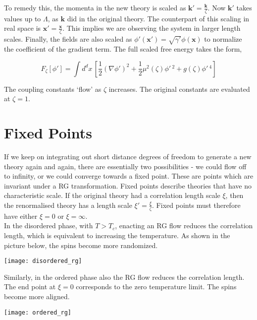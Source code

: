 \noindent To remedy this, the momenta in the new theory is scaled as $\boldsymbol{k}'=\frac{\boldsymbol{k}}{\zeta}$. Now $\boldsymbol{k}'$ takes values up to $\Lambda$, as $\boldsymbol{k}$ did in the original theory. The counterpart of this scaling in real space is $\boldsymbol{x}'=\frac{\boldsymbol{x}}{\zeta}$. This implies we are observing the system in larger length scales. Finally, the fields are also scaled as $\phi'(\boldsymbol{x}')=\sqrt{\gamma'}\phi(\boldsymbol{x})$ to normalize the coefficient of the gradient term. The full scaled free energy takes the form,

$$F_\zeta[\phi']=\int d^dx\, \left[\frac{1}{2}(\nabla\phi')^2+\frac{1}{2}\mu^2(\zeta)\phi'\,^2+g(\zeta)\phi'\,^4\right]$$

\noindent The coupling constants `flow' as $\zeta$ increases. The original constants are evaluated at $\zeta=1$.

\section{Fixed Points}
If we keep on integrating out short distance degrees of freedom to generate a new theory again and again, there are essentially two possibilities - we could flow off to infinity, or we could converge towards a fixed point. These are points which are invariant under a RG transformation. Fixed points describe theories that have no characteristic scale. If the original theory had a correlation length scale $\xi$, then the renormalised theory has a length scale $\xi'=\frac{\xi}{\zeta}$. Fixed points must therefore have either $\xi=0$ or $\xi=\infty$.\\

\noindent In the disordered phase, with $T>T_c$, enacting an RG flow reduces the correlation length, which is equivalent to increasing the temperature. As shown in the picture below, the spins become more randomized.

\begin{center}
    \texttt{[image: disordered\_rg]}
\end{center}

\noindent Similarly, in the ordered phase also the RG flow reduces the correlation length. The end point at $\xi=0$ corresponds to the zero temperature limit. The spins become more aligned.

\begin{center}
    \texttt{[image: ordered\_rg]}
\end{center}

